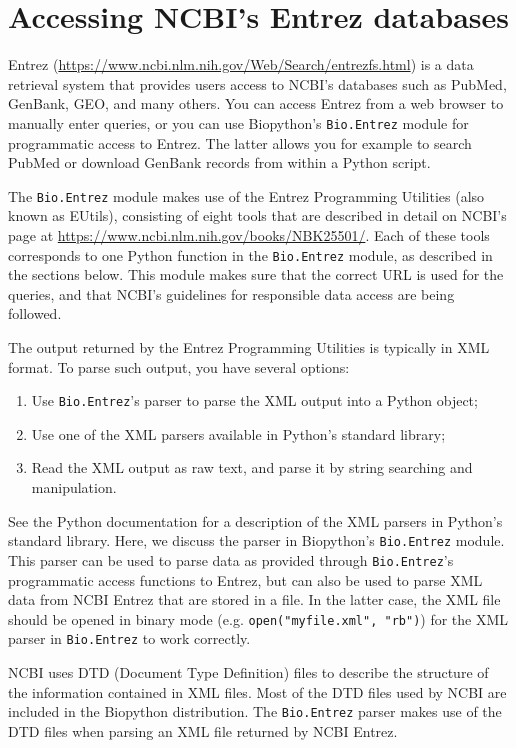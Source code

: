 \chapter{Accessing NCBI's Entrez databases}
\label{chapter:entrez}

Entrez (\url{https://www.ncbi.nlm.nih.gov/Web/Search/entrezfs.html}) is a data retrieval system that provides users access to NCBI's databases such as PubMed, GenBank, GEO, and many others. You can access Entrez from a web browser to manually enter queries, or you can use Biopython's \verb+Bio.Entrez+ module for programmatic access to Entrez. The latter allows you for example to search PubMed or download GenBank records from within a Python script.

The \verb+Bio.Entrez+ module makes use of the Entrez Programming Utilities (also known as EUtils), consisting of eight tools that are described in detail on NCBI's page at \url{https://www.ncbi.nlm.nih.gov/books/NBK25501/}.
Each of these tools corresponds to one Python function in the \verb+Bio.Entrez+ module, as described in the sections below. This module makes sure that the correct URL is used for the queries, and that NCBI's guidelines for responsible data access are being followed.

The output returned by the Entrez Programming Utilities is typically in XML format. To parse such output, you have several options:
\begin{enumerate}
  \item Use \verb+Bio.Entrez+'s parser to parse the XML output into a Python object;
  \item Use one of the XML parsers available in Python's standard library;
  \item Read the XML output as raw text, and parse it by string searching and manipulation.
\end{enumerate}
See the Python documentation for a description of the XML parsers in Python's standard library. Here, we discuss the parser in Biopython's \verb+Bio.Entrez+ module. This parser can be used to parse data as provided through \verb+Bio.Entrez+'s programmatic access functions to Entrez, but can also be used to parse XML data from NCBI Entrez that are stored in a file. In the latter case, the XML file should be opened in binary mode (e.g. \verb+open("myfile.xml", "rb")+) for the XML parser in \verb+Bio.Entrez+ to work correctly.

NCBI uses DTD (Document Type Definition) files to describe the structure of the information contained in XML files. Most of the DTD files used by NCBI are included in the Biopython distribution. The \verb+Bio.Entrez+ parser makes use of the DTD files when parsing an XML file returned by NCBI Entrez.

